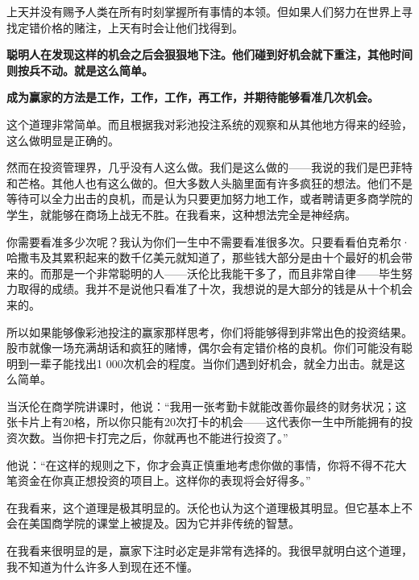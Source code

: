 上天并没有赐予人类在所有时刻掌握所有事情的本领。但如果人们努力在世界上寻找定错价格的赌注，上天有时会让他们找得到。
\par

\textbf{聪明人在发现这样的机会之后会狠狠地下注。他们碰到好机会就下重注，其他时间则按兵不动。就是这么简单。}
\par

\textbf{成为赢家的方法是工作，工作，工作，再工作，并期待能够看准几次机会。}
\par

这个道理非常简单。而且根据我对彩池投注系统的观察和从其他地方得来的经验，这么做明显是正确的。
\par

然而在投资管理界，几乎没有人这么做。我们是这么做的——我说的我们是巴菲特和芒格。其他人也有这么做的。但大多数人头脑里面有许多疯狂的想法。他们不是等待可以全力出击的良机，而是认为只要更加努力地工作，或者聘请更多商学院的学生，就能够在商场上战无不胜。在我看来，这种想法完全是神经病。
\par

你需要看准多少次呢？我认为你们一生中不需要看准很多次。只要看看伯克希尔·哈撒韦及其累积起来的数千亿美元就知道了，那些钱大部分是由十个最好的机会带来的。而那是一个非常聪明的人——沃伦比我能干多了，而且非常自律——毕生努力取得的成绩。我并不是说他只看准了十次，我想说的是大部分的钱是从十个机会来的。
\par

所以如果能够像彩池投注的赢家那样思考，你们将能够得到非常出色的投资结果。股市就像一场充满胡话和疯狂的赌博，偶尔会有定错价格的良机。你们可能没有聪明到一辈子能找出1 000次机会的程度。当你们遇到好机会，就全力出击。就是这么简单。
\par

当沃伦在商学院讲课时，他说：“我用一张考勤卡就能改善你最终的财务状况；这张卡片上有20格，所以你只能有20次打卡的机会——这代表你一生中所能拥有的投资次数。当你把卡打完之后，你就再也不能进行投资了。”
\par

他说：“在这样的规则之下，你才会真正慎重地考虑你做的事情，你将不得不花大笔资金在你真正想投资的项目上。这样你的表现将会好得多。”
\par

在我看来，这个道理是极其明显的。沃伦也认为这个道理极其明显。但它基本上不会在美国商学院的课堂上被提及。因为它并非传统的智慧。
\par

在我看来很明显的是，赢家下注时必定是非常有选择的。我很早就明白这个道理，我不知道为什么许多人到现在还不懂。
\par

